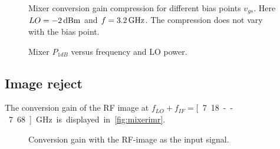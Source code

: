			\begin{figure}[hbt!]
				\centering
				\caption[Mixer conversion gain compression.]{Mixer conversion gain compression for different bias points $v_{gs}$. Here $LO=\unit[-2]{dBm}$ and $f=\unit[3.2]{GHz}$. The compression does not vary with the bias point.}\label{fig:mixerp1dbvsbias}
			\end{figure}

			\begin{figure}[hpt!]
				\centering
				\caption[Mixer $P_{1dB}$.]{Mixer $P_{1dB}$ versus frequency and LO power.}\label{fig:mixerp1db}
			\end{figure}

		\subsection{Image reject}
			The conversion gain of the RF image at $f_{LO}+f_{IF}=$\unit[7.18--7.68]{GHz} is displayed in \autoref{fig:mixerimr}.

			\begin{figure}[hbt!]
				\centering
				\caption[RF-image conversion gain.]{Conversion gain with the RF-image as the input signal.}\label{fig:mixerimr}
			\end{figure}

